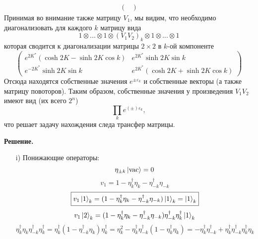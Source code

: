 \documentclass[12pt]{article}
\theoremstyle{definition}
\begin{document}
\begin{enumerate}
\begin{itemize}
\begin{multline}
\begin{pmatrix}
            \end{pmatrix}
        \end{multline}
        Принимая во внимание также матрицу $V_1$, мы видим, что необходимо диагонализовать для каждого $k$ матрицу вида
        \begin{equation}
            1\otimes...\otimes1\otimes(V_1V_2)_k\otimes1\otimes...\otimes1
        \end{equation}
        которая сводится к диагонализации матрицы $2\times2$ в $k$-ой компоненте
        \begin{equation}
            \begin{pmatrix}
                e^{2K^*}(\cosh2K-\sinh2K\cos k) & e^{2K^*}\sinh2K\sin k\\
                e^{-2K^*}\sinh2K\sin k & e^{2K^*}(\cosh2K+\sinh2K\cos k)
            \end{pmatrix}
        \end{equation}
        Отсюда находятся собственные значения $e^{\pm\varepsilon_k}$ и собственные векторы (а также матрицу повоторов). Таким образом, собственные значения у произведения $V_1V_2$ имеют вид (их всего $2^n$)
        \begin{equation}
            \prod\limits_ke^{(\pm)\varepsilon_k},
        \end{equation}
        что решает задачу нахождения следа трансфер матрицы.
    \end{itemize}
    \textbf{Решение.}
    \begin{itemize}
        \item[i)] Понижающие операторы:
        \begin{equation}
            \eta_{\pm k}\ket{\text{vac}}=0
        \end{equation}
        \begin{equation}
            v_1=1-\eta^\dagger_k\eta_k-\eta^\dagger_{-k}\eta_{-k}
        \end{equation}
        \begin{equation}
            \boxed{v_1\ket{1}_k=(1-\eta^\dagger_k\eta_k-\eta^\dagger_{-k}\eta_{-k})\ket{1}_k=\ket{1}_k}
        \end{equation}
        \begin{equation}
            v_1\ket{2}_k=(1-\eta^\dagger_k\eta_k-\eta^\dagger_{-k}\eta_{-k})\eta^\dagger_{-k}\eta^\dagger_k\ket{1}_k
        \end{equation}
        \begin{equation}
            \eta^\dagger_k\eta_k\eta^\dagger_{-k}\eta^\dagger_k=\eta^\dagger_k(1-\eta^\dagger_{-k}\eta_k)\eta^\dagger_k=\eta_k^2-\eta^\dagger_k\eta^\dagger_{-k}(1-\eta^\dagger_k\eta_k)=-\eta^\dagger_k\eta^\dagger_{-k}+\eta^\dagger_k\eta^\dagger_{-k}\eta^\dagger_k\eta_k

\end{equation}
\end{itemize}
\end{enumerate}
\end{document}
